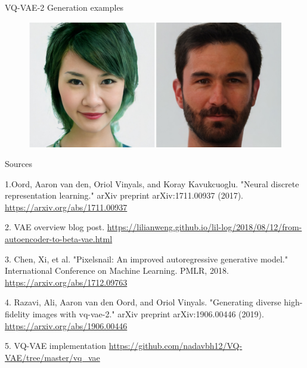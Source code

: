 \documentclass{beamer}
\begin{document}
\begin{frame}{VQ-VAE-2 Generation examples}

\begin{figure}[h]
\includegraphics[width=\textwidth]{img/gen-faces-2}
\end{figure}

\end{frame}
\begin{frame}{Sources}
\begin{thebibliography}{0}

   1.Oord, Aaron van den, Oriol Vinyals, and Koray Kavukcuoglu. "Neural discrete representation learning." arXiv preprint arXiv:1711.00937 (2017). \url{https://arxiv.org/abs/1711.00937} 
  
   2. VAE overview blog post. \url{https://lilianweng.github.io/lil-log/2018/08/12/from-autoencoder-to-beta-vae.html}
  
   3. Chen, Xi, et al. "Pixelsnail: An improved autoregressive generative model." International Conference on Machine Learning. PMLR, 2018. \url{https://arxiv.org/abs/1712.09763}
  
   4. Razavi, Ali, Aaron van den Oord, and Oriol Vinyals. "Generating diverse high-fidelity images with vq-vae-2." arXiv preprint arXiv:1906.00446 (2019). \url{https://arxiv.org/abs/1906.00446}
  
   5. VQ-VAE implementation \url{https://github.com/nadavbh12/VQ-VAE/tree/master/vq_vae}
  
\end{thebibliography}

\end{frame}

 
\end{document}
